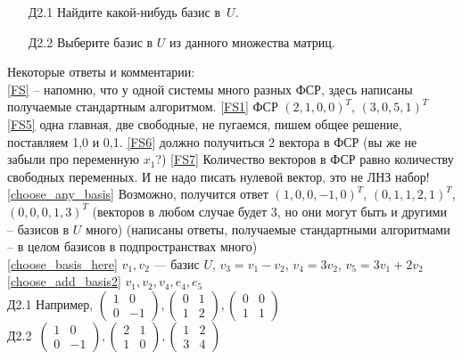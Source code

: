 \documentclass[12pt]{article}
\newcommand{\plainenumii}{\renewcommand{\theenumii}{\arabic{enumi}.\arabic{enumii}}}
\begin{document}
\begin{enumerate}
\begin{enumerate}[i] \plainenumii
	\item[Д2.1] Найдите какой-нибудь базис в~$U$. 
	\item[Д2.2] Выберите базис в $U$ из данного множества матриц. 
\end{enumerate}
\end{enumerate}



\vspace{1cm}

{\footnotesize 
Некоторые ответы и комментарии: \\
\ref{FS} -- напомню, что у одной системы много разных ФСР, здесь написаны получаемые стандартным алгоритмом. \quad
\ref{FS1} ФСР $(2,1,0,0)^T$, $(3,0,5,1)^T$ \quad 
\ref{FS5} одна главная, две свободные, не пугаемся, пишем общее решение, поставляем 1,0 и 0,1. \quad 
\ref{FS6} должно получиться 2 вектора в ФСР (вы же не забыли про переменную $x_1$?) \quad 
\ref{FS7} Количество векторов в ФСР равно количеству свободных переменных. И не надо писать нулевой вектор, это не ЛНЗ набор! \quad 
\ref{choose_any_basis} Возможно, получится ответ $(1,0,0,-1,0)^T$, $(0,1,1,2,1)^T$, $(0,0,0,1,3)^T$ (векторов в любом случае будет 3, но они могут быть и другими -- базисов в $U$ много) 
(написаны ответы, получаемые стандартными алгоритмами -- в целом базисов в подпространствах много)\\
\ref{choose_basis_here} $v_1, v_2$ --- базис $U$, $v_3 = v_1 - v_2$, $v_4 = 3v_2$, $v_5 = 3v_1+2v_2$ \\
\ref{choose_add_basis2} $v_1, v_2, v_4, e_4, e_5$ \\ 
Д2.1 Например, $\begin{pmatrix}1 & 0\\0 & -1\end{pmatrix}, \begin{pmatrix}0 & 1\\1 & 2\end{pmatrix}, \begin{pmatrix}0 & 0\\1 & 1\end{pmatrix}$ \\ Д2.2~$\begin{pmatrix}1 & 0\\0 & -1\end{pmatrix}, \begin{pmatrix}2 & 1\\1 & 0\end{pmatrix}, \begin{pmatrix}1 & 2\\3 & 4\end{pmatrix}$
}
\end{document}

